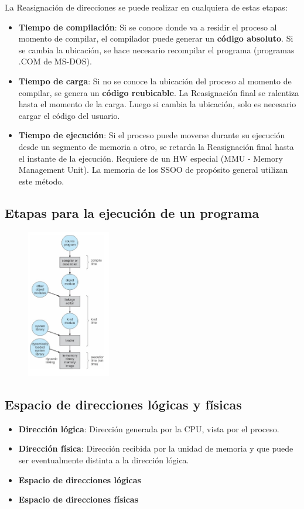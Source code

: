 \documentclass{templateNote}
\begin{document}
La Reasignación de direcciones se puede realizar en cualquiera de estas etapas:
\begin{itemize}
    \item \textbf{Tiempo de compilación}: Si se conoce donde va a residir el proceso al momento de compilar, el compilador puede generar un \textbf{código absoluto}. Si se cambia la ubicación, se hace necesario recompilar el programa (programas .COM de MS-DOS).
    \item \textbf{Tiempo de carga}: Si no se conoce la ubicación del proceso al momento de compilar, se genera un \textbf{código reubicable}. La Reasignación final se ralentiza hasta el momento de la carga. Luego si cambia la ubicación, solo es necesario cargar el código del usuario.
    \item \textbf{Tiempo de ejecución}: Si el proceso puede moverse durante su ejecución desde un segmento de memoria a otro, se retarda la Reasignación final hasta el instante de la ejecución. Requiere de un HW especial (MMU - Memory Management Unit). La memoria de los SSOO de propósito general utilizan este método.
\end{itemize}

\subsection{Etapas para la ejecución de un programa}
\begin{figure}[H]
    \centering
    \includegraphics[width=0.325\textwidth]{img/cargaprograma.png}
\end{figure}

\subsection{Espacio de direcciones lógicas y físicas}
\begin{itemize}
    \item \textbf{Dirección lógica}: Dirección generada por la CPU, vista por el proceso.
    \item \textbf{Dirección física}: Dirección recibida por la unidad de memoria y que puede ser eventualmente distinta a la dirección lógica.
    \item \textbf{Espacio de direcciones lógicas}
    \item \textbf{Espacio de direcciones físicas}
\end{itemize}
\end{document}
